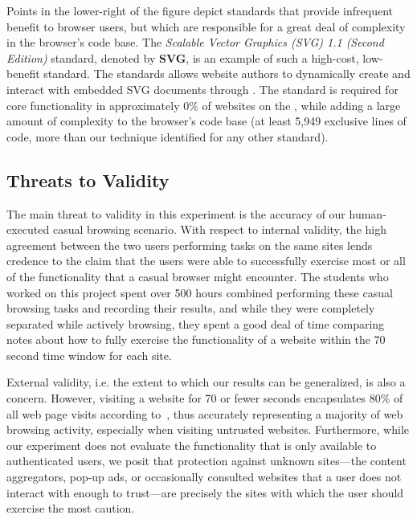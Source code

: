 Points in the lower-right of the figure depict standards that provide
infrequent benefit to browser users, but which are responsible for a great
deal of complexity in the browser's code base.  The \textit{Scalable Vector
Graphics (SVG) 1.1 (Second Edition)} standard, denoted by \textbf{SVG},
is an example of such a high-cost, low-benefit standard.  The standards
allows website authors to dynamically create and interact with embedded SVG
documents through \JS.  The standard is required for core functionality in
approximately 0\% of websites on the \ATK, while adding a large amount of
complexity to the browser's code base (at least 5,949 exclusive lines of
code, more than our technique identified for any other standard).


\subsection{Threats to Validity}
The main threat to validity in this experiment is the accuracy of our
human-executed casual browsing scenario. With respect to internal validity, the
high agreement between the two users performing tasks on the same sites lends
credence to the claim that the users were able to successfully exercise most or
all of the functionality that a casual browser might encounter. The students
who worked on this project spent over 500 hours combined performing these
casual browsing tasks and recording their results, and while they were
completely separated while actively browsing, they spent a good deal of time
comparing notes about how to fully exercise the functionality of a website
within the 70 second time window for each site.

External validity, i.e. the extent to which our results can be generalized, is also
a concern. However, visiting a website for 70 or fewer seconds encapsulates
80\% of all web page visits according to~\cite{liu2010understanding}, thus
accurately representing a majority of web browsing activity, especially when
visiting untrusted websites. Furthermore, while our experiment does not
evaluate the \JS functionality that is only available to authenticated users,
we posit that protection against unknown sites---the content aggregators,
pop-up ads, or occasionally consulted websites that a user does not interact
with enough to trust---are precisely the sites with which the user should
exercise the most caution.